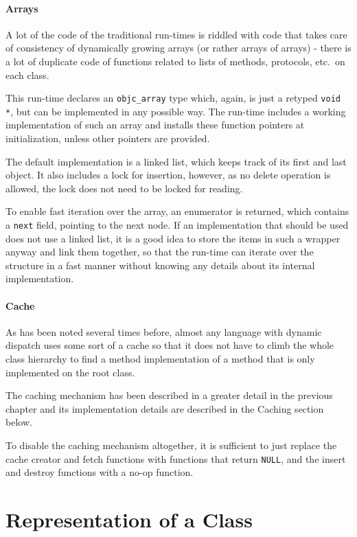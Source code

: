 \paragraph{Arrays}

A lot of the code of the traditional run-times is riddled with code that takes care of consistency of dynamically growing arrays (or rather arrays of arrays) - there is a lot of duplicate code of functions related to lists of methods, protocols, etc.\ on each class.

This run-time declares an \verb=objc_array= type which, again, is just a retyped \verb=void *=, but can be implemented in any possible way. The run-time includes a working implementation of such an array and installs these function pointers at initialization, unless other pointers are provided.

The default implementation is a linked list, which keeps track of its first and last object. It also includes a lock for insertion, however, as no delete operation is allowed, the lock does not need to be locked for reading.

To enable fast iteration over the array, an enumerator is returned, which contains a \verb=next= field, pointing to the next node. If an implementation that should be used does not use a linked list, it is a good idea to store the items in such a wrapper anyway and link them together, so that the run-time can iterate over the structure in a fast manner without knowing any details about its internal implementation.

\paragraph{Cache}

As has been noted several times before, almost any language with dynamic dispatch uses some sort of a cache so that it does not have to climb the whole class hierarchy to find a method implementation of a method that is only implemented on the root class.

The caching mechanism has been described in a greater detail in the previous chapter and its implementation details are described in the Caching section below.

To disable the caching mechanism altogether, it is sufficient to just replace the cache creator and fetch functions with functions that return \verb=NULL=, and the insert and destroy functions with a no-op function.

\section{Representation of a Class}

